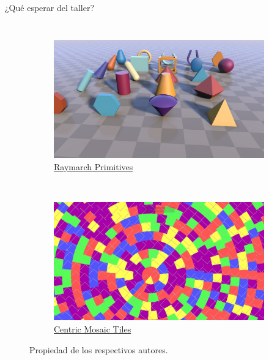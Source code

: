 \begin{frame}{¿Qué esperar del taller?}
\begin{columns}
\begin{figure}[htp]
\begin{subfigure}[b]{0.42\textwidth}
   \includegraphics[width=\textwidth]{img/Demo/Raymarching-Primitives}
   \caption{\href{https://www.shadertoy.com/view/Xds3zN}{Raymarch Primitives}}
 \end{subfigure}
~
 \begin{subfigure}[b]{0.42\textwidth}
   \includegraphics[width=\textwidth]{img/Demo/AnimatedCentricMosaicTiles}
   \caption{\href{https://www.shadertoy.com/view/43tfRr}{Centric Mosaic Tiles}}
 \end{subfigure}
 \caption{Propiedad de los respectivos autores.}
\end{figure}
\end{columns}
\end{frame}

